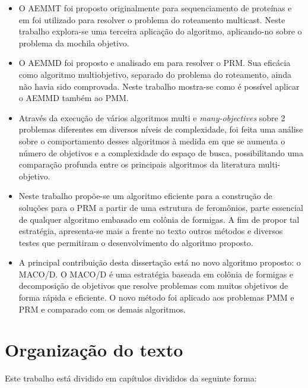 \begin{itemize}  
	\item O \ac{AEMMT} foi proposto originalmente para sequenciamento de proteínas \cite{Brasil2013} e em \cite{Lafeta2016} foi utilizado para resolver o problema do roteamento multicast. Neste trabalho explora-se uma terceira aplicação do algoritmo, aplicando-no sobre o problema da mochila objetivo.
	\item O \ac{AEMMD} foi proposto e analisado em \cite{Lafeta2016} para resolver o \ac{PRM}. Sua eficácia como algoritmo multiobjetivo, separado do problema do roteamento, ainda não havia sido comprovada. Neste trabalho mostra-se como é possível aplicar o \ac{AEMMD} também ao \ac{PMM}.
	\item Através da execução de vários algoritmos multi e \textit{many-objectives} sobre 2 problemas diferentes em diversos níveis de complexidade, foi feita uma análise sobre o comportamento desses algoritmos à medida em que se aumenta o número de objetivos e a complexidade do espaço de busca, possibilitando uma comparação profunda entre os principais algoritmos da literatura multi-objetivo.
	\item Neste trabalho propõe-se um algoritmo eficiente para a construção de soluções para o \ac{PRM} a partir de uma estrutura de feromônios, parte essencial de qualquer algoritmo embasado em colônia de formigas. A fim de propor tal estratégia, apresenta-se mais a frente no texto outros métodos e diversos testes que permitiram o desenvolvimento do algoritmo proposto. 
	\item A principal contribuição desta dissertação está no novo algoritmo proposto: o \ac{MACO/D}. O \ac{MACO/D} é uma estratégia baseada em colônia de formigas e decomposição de objetivos que resolve problemas com muitos objetivos de forma rápida e eficiente. O novo método foi aplicado aos problemas \ac{PMM} e \ac{PRM} e comparado com os demais algoritmos.
\end{itemize}

\section{Organização do texto}
Este trabalho está dividido em capítulos divididos da seguinte forma:

